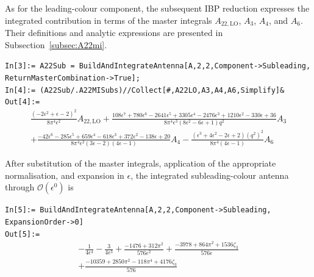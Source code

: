 As for the leading-colour component, the subsequent IBP reduction expresses the integrated
contribution in terms of the master integrals $A_{22,\mathrm{LO}}$, $A_3$, $A_4$, and $A_6$. Their
definitions and analytic expressions are presented in Subsection~\ref{subsec:A22mi}.

\begin{mdframed}[backgroundcolor=gray!10, linewidth=0pt]
\texttt{In[3]:= A22Sub = BuildAndIntegrateAntenna[A,2,2,Component->Subleading,\\ReturnMasterCombination->True];}\\
\texttt{In[4]:= (A22Sub/.A22MISubs)//Collect[\#,{A22LO,A3,A4,A6},Simplify]\&}\\
\hfill
\texttt{Out[4]:=}
    \begin{equation*}
        \begin{gathered}
            \frac{\left(-2\epsilon^2+\epsilon-2\right)^2}{8\pi^4\epsilon^2}A_{22,\text{LO}}
            +\frac{108\epsilon^7+780\epsilon^6-2641\epsilon^5+3305\epsilon^4-2476\epsilon^3+1210\epsilon^2-330\epsilon+36}{8\pi^4\epsilon^3\left(8\epsilon^2-6\epsilon+1\right)q^2}A_3\\
            +\frac{-42\epsilon^6-285\epsilon^5+659\epsilon^4-618\epsilon^3+372\epsilon^2-138\epsilon+20}{8\pi^4\epsilon^2(3\epsilon-2)(4\epsilon-1)}A_4
            -\frac{\left(\epsilon^3+4\epsilon^2-2\epsilon+2\right)\left(q^2\right)^2}{8\pi^4(4\epsilon-1)}A_6
        \end{gathered}
    \end{equation*}
\end{mdframed}

After substitution of the master integrals, application of the appropriate normalisation, and
expansion in $\epsilon$, the integrated subleading-colour antenna through $\mathcal O(\epsilon^0)$ is

\begin{mdframed}[backgroundcolor=gray!10, linewidth=0pt]
\texttt{In[5]:= BuildAndIntegrateAntenna[A,2,2,Component->Subleading,\\ExpansionOrder->0]}\\
\hfill
\texttt{Out[5]:=}
    \begin{equation*}
        \begin{gathered}
            -\frac1{4\epsilon^4}-\frac3{4\epsilon^3}+\frac{-1476+312\pi^2}{576\epsilon^2}+\frac{-3978+864\pi^2+1536\zeta_3}{576\epsilon}\\
            +\frac{-10359+2850\pi^2-118\pi^4+4176\zeta_3}{576}
        \end{gathered}
    \end{equation*}
\end{mdframed}

